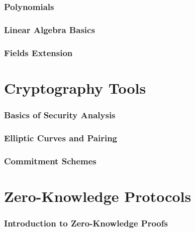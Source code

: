 \documentclass{zkdl-template}
\begin{document}
    \section{Polynomials}\label{section:polynomial-rings}
    

    \section{Linear Algebra Basics}\label{section:linear-algebra}
    

    \section{Fields Extension}\label{section:finite-fields}
    


    \part{Cryptography Tools}
    

    \section{Basics of Security Analysis}\label{section:security-analysis}
    

    \section{Elliptic Curves and Pairing}\label{section:elliptic-curves}
    

    \section{Commitment Schemes}\label{section:commitment-schemes}
    


    \part{Zero-Knowledge Protocols}
    

    \section{Introduction to Zero-Knowledge Proofs}\label{section:intro-zk}
    
\end{document}
